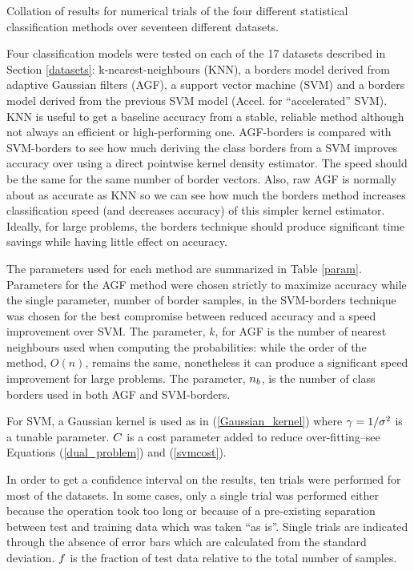 \begin{table}
	\caption{Collation of results for numerical trials of the four different statistical classification methods over seventeen different datasets.}
	\label{results2}
	{\small
		
	}
\end{table}

Four classification models were tested on each of the 17 datasets described in
Section \ref{datasets}: k-nearest-neighbours (KNN), a borders model derived from
adaptive Gaussian filters (AGF), a support vector machine (SVM) and a borders
model derived from the previous SVM model (Accel. for ``accelerated'' SVM).
KNN is useful to get a baseline accuracy from a stable, reliable method although
not always an efficient or high-performing one.
AGF-borders is compared with SVM-borders to see how much deriving the class borders
from a SVM improves accuracy over using a direct pointwise kernel density estimator.
The speed should be the same for the same number of border vectors.
Also, raw AGF is normally about as accurate as KNN so we can see how much the 
borders method increases classification speed (and decreases accuracy) of this simpler kernel estimator.
Ideally, for large problems, the borders technique should produce significant time
savings while having little effect on accuracy.

The parameters used for each method are summarized in Table \ref{param}.
Parameters for the AGF method were chosen strictly to maximize accuracy while
the single parameter, number of border samples, in the SVM-borders technique
was chosen for the best compromise between reduced accuracy and a speed
improvement over SVM. The parameter, $k$, for AGF is the number of nearest
neighbours used when computing the probabilities: 
while the order of the method, $O(n)$, remains the same, nonetheless it can produce a significant speed improvement for large problems.
The parameter, $n_b$, is the number of class borders used in both 
AGF and SVM-borders.

For SVM, a Gaussian kernel is used as in (\ref{Gaussian_kernel})
where $\gamma=1/\sigma^2$ is a tunable parameter. 
$C$ is a cost parameter added to reduce over-fitting--see
Equations (\ref{dual_problem}) and (\ref{svmcost}).

In order to get a confidence interval on the results,
ten trials were performed for most of the datasets.
In some cases, only a single trial was performed either because the operation
took too long or because of a pre-existing separation between test and training
data which was taken ``as is''. Single trials are indicated through the absence of
error bars which are calculated from the standard deviation.
$f$ is the fraction of test data relative to the total number
of samples.

